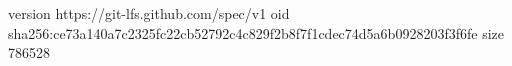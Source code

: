version https://git-lfs.github.com/spec/v1
oid sha256:ce73a140a7c2325fc22cb52792c4c829f2b8f7f1cdec74d5a6b0928203f3f6fe
size 786528
